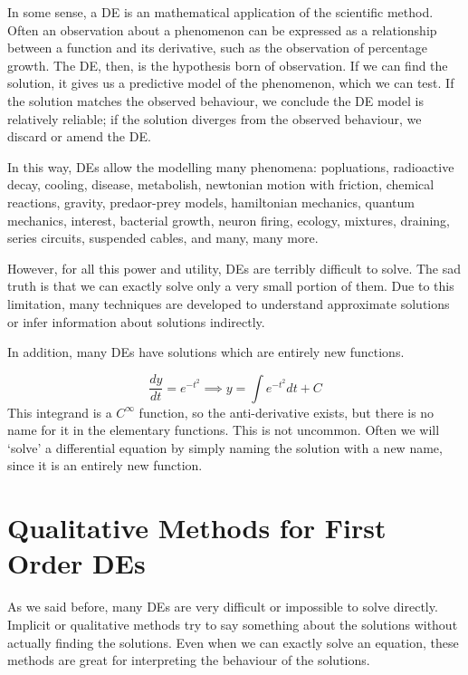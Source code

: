 \documentclass[fleqn,letterpaper]{report}
\begin{document}
In some sense, a DE is an mathematical application of the
scientific method. Often an observation about a phenomenon can
be expressed as a relationship between a function and its
derivative, such as the observation of percentage growth. The
DE, then, is the hypothesis born of observation. If we can
find the solution, it gives us a predictive model of the
phenomenon, which we can test. If the solution matches the
observed behaviour, we conclude the DE model is relatively
reliable; if the solution diverges from the observed
behaviour, we discard or amend the DE.

In this way, DEs allow the modelling many phenomena:
popluations, radioactive decay, cooling, disease, 
metabolish, newtonian motion with friction, chemical
reactions, gravity, predaor-prey models, hamiltonian
mechanics, quantum mechanics, interest, bacterial growth,
neuron firing, ecology, mixtures, draining, series
circuits, suspended cables, and many, many more.

However, for all this power and utility, DEs are terribly
difficult to solve. The sad truth is that we can exactly
solve only a very small portion of them. Due to this
limitation, many techniques are developed to understand
approximate solutions or infer information about solutions
indirectly.

In addition, many DEs have solutions which are entirely new
functions. 

\begin{example} 
\begin{equation*}
\frac{dy}{dt} = e^{-t^2} \implies y = \int e^{-t^2}dt + C
\end{equation*}
This integrand is a $C^\infty$ function, so the
anti-derivative exists, but there is no name for it in the
elementary functions. This is not uncommon. Often we will
`solve' a differential equation by simply naming the solution
with a new name, since it is an entirely new function.
\end{example}

\section{Qualitative Methods for First Order DEs}
\label{qualitative-methods}

As we said before, many DEs are very difficult or impossible
to solve directly. Implicit or qualitative methods try to say
something about the solutions without actually finding the
solutions. Even when we can exactly solve an equation, these
methods are great for interpreting the behaviour of the
solutions.
\end{document}
